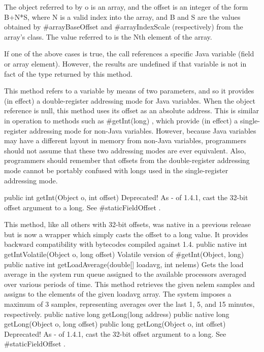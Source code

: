 The object referred to by o is an array, and the offset
is an integer of the form B+N*S, where N is
a valid index into the array, and B and S are
the values obtained by #arrayBaseOffset  and #arrayIndexScale  (respectively) from the array's class.  The value
referred to is the Nth element of the array.



If one of the above cases is true, the call references a specific Java
variable (field or array element).  However, the results are undefined
if that variable is not in fact of the type returned by this method.


This method refers to a variable by means of two parameters, and so
it provides (in effect) a double-register addressing mode
for Java variables.  When the object reference is null, this method
uses its offset as an absolute address.  This is similar in operation
to methods such as #getInt(long) , which provide (in effect) a
single-register addressing mode for non-Java variables.
However, because Java variables may have a different layout in memory
from non-Java variables, programmers should not assume that these
two addressing modes are ever equivalent.  Also, programmers should
remember that offsets from the double-register addressing mode cannot
be portably confused with longs used in the single-register addressing
mode.

 public int getInt(Object o,
    int offset) 
Deprecated! As - of 1.4.1, cast the 32-bit offset argument to a long. See #staticFieldOffset .

This method, like all others with 32-bit offsets, was native in a previous release but is now a wrapper which simply casts the offset to a long value. It provides backward compatibility with bytecodes compiled against 1.4.
 public native int getIntVolatile(Object o,
    long offset)
Volatile version of #getInt(Object, long) 
 public native int getLoadAverage(double[] loadavg,
    int nelems)
Gets the load average in the system run queue assigned
to the available processors averaged over various periods of time.
This method retrieves the given nelem samples and
assigns to the elements of the given loadavg array.
The system imposes a maximum of 3 samples, representing
averages over the last 1,  5,  and  15 minutes, respectively.
 public native long getLong(long address)
 public native long getLong(Object o,
    long offset)
 public long getLong(Object o,
    int offset) 
Deprecated! As - of 1.4.1, cast the 32-bit offset argument to a long. See #staticFieldOffset .

